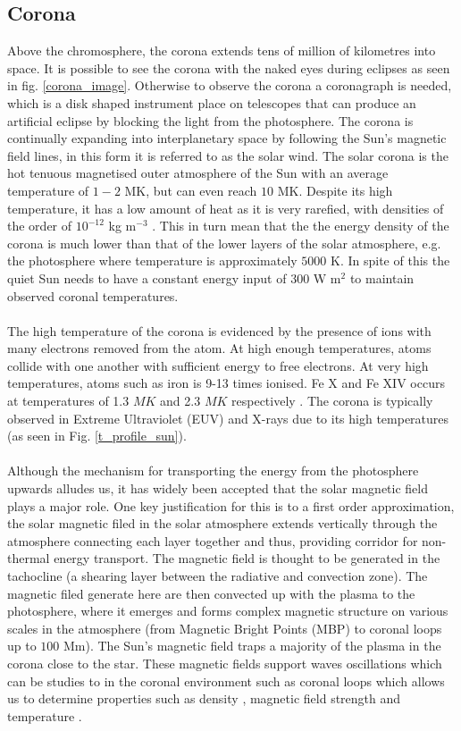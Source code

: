 \documentclass[12pt]{ociamthesis}
\begin{document}
\subsection{Corona}
Above the chromosphere, the corona extends tens of million of kilometres into space. It is possible to see the corona with the naked eyes during eclipses as seen in fig. \ref{corona_image}. Otherwise to observe the corona a coronagraph is needed, which is a disk shaped instrument place on telescopes that can produce an artificial eclipse by blocking the light from the photosphere. The corona is continually expanding into interplanetary space by following the Sun's magnetic field lines, in this form it is referred to as the solar wind. The solar corona is the hot tenuous magnetised outer atmosphere of the Sun with an average temperature of $1-2$ MK, but can even reach $10$ MK. Despite its high temperature, it has a low amount of heat as it is very rarefied, with densities of the order of $10^{-12}$ kg m$^{-3}$ \citep{priest2014magnetohydrodynamics}. This in turn mean that the the energy density of the corona is much lower than that of the lower layers of the solar atmosphere, e.g. the photosphere where temperature is approximately $5000$ K. In spite of this the quiet Sun needs to have a constant energy input of $300$ W m$^2$ \citep{priest2014magnetohydrodynamics} to maintain observed coronal temperatures. \\ \\ The high temperature of the corona is evidenced by the presence of ions with many electrons removed from the atom. At high enough temperatures, atoms collide with one another with sufficient energy to free electrons. At very high temperatures, atoms such as iron is 9-13 times ionised. Fe X and Fe XIV occurs at temperatures of 1.3 $MK$ and 2.3  $MK$ respectively \citep{narayanan2014introduction}. The corona is typically observed in Extreme Ultraviolet (EUV) and X-rays due to its high temperatures (as seen in Fig. \ref{t_profile_sun}). \\ \\ Although the mechanism for transporting the energy from the photosphere upwards alludes us, it has widely been accepted that the solar magnetic field plays a major role. One key justification for this is to a first order approximation, the solar magnetic filed in the solar atmosphere extends vertically through the atmosphere connecting each layer together and thus, providing corridor for non-thermal energy transport. The magnetic field is thought to be generated in the tachocline (a shearing layer between the radiative and convection zone). The magnetic filed generate here are then convected up with the plasma to the photosphere, where it emerges and forms complex magnetic structure on various scales in the atmosphere (from Magnetic Bright Points (MBP) to coronal loops up to $100$ Mm). The Sun's magnetic field traps a majority of the plasma in the corona close to the star. These magnetic fields support waves oscillations which can be studies to in the coronal environment such as coronal loops which allows us to determine properties such as density \citep{Verwichte_2013A_A}, magnetic field strength \citep{Nakariakov_2001} and temperature \citep{De_Moortel_2003SoPh}.    
\end{document}

